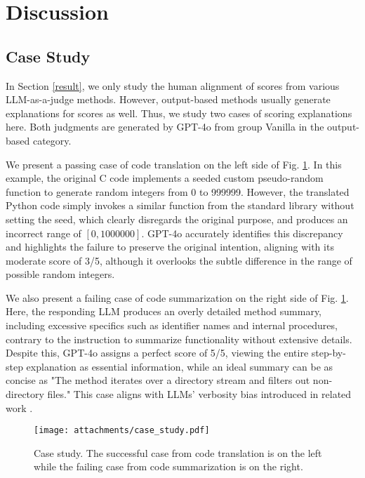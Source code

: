 \section{Discussion\label{discussion}}
\subsection{Case Study}
In Section \ref{result}, we only study the human alignment of scores from various LLM-as-a-judge methods. However, output-based methods usually generate explanations for scores as well. Thus, we study two cases of scoring explanations here. Both judgments are generated by GPT-4o from group Vanilla in the output-based category.

We present a passing case of code translation on the left side of Fig. \ref{fig:case_study}. In this example, the original C code implements a seeded custom pseudo-random function to generate random integers from 0 to 999999. However, the translated Python code simply invokes a similar function from the standard library without setting the seed, which clearly disregards the original purpose, and produces an incorrect range of \([0, 1000000]\). GPT-4o accurately identifies this discrepancy and highlights the failure to preserve the original intention, aligning with its moderate score of 3/5, although it overlooks the subtle difference in the range of possible random integers.

We also present a failing case of code summarization on the right side of Fig. \ref{fig:case_study}. Here, the responding LLM produces an overly detailed method summary, including excessive specifics such as identifier names and internal procedures, contrary to the instruction to summarize functionality without extensive details. Despite this, GPT-4o assigns a perfect score of 5/5, viewing the entire step-by-step explanation as essential information, while an ideal summary can be as concise as "The method iterates over a directory stream and filters out non-directory files." This case aligns with LLMs' verbosity bias introduced in related work \cite{DBLP:journals/corr/abs-2310-10076}.

\begin{figure}
    \centering
    \texttt{[image: attachments/case\_study.pdf]}
    \vspace{-2.0em}
    \caption{Case study. The successful case from code translation is on the left while the failing case from code summarization is on the right.}
    \label{fig:case_study}
    \vspace{-1.0em}
\end{figure}

